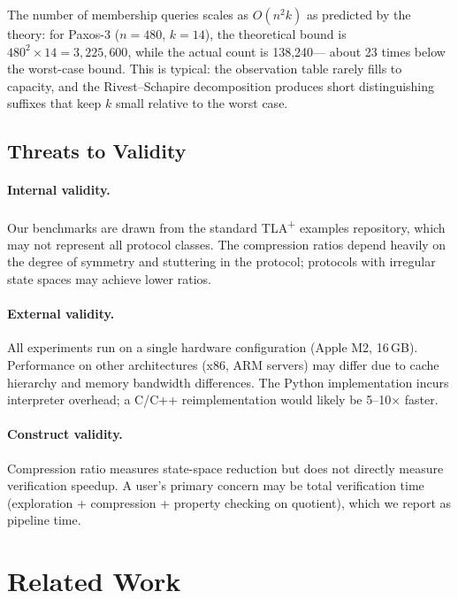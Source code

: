 \documentclass[11pt]{article}
\newcommand{\TLAplus}{TLA\textsuperscript{+}}
\begin{document}
The number of membership queries scales as $O(n^2 k)$ as predicted by the
theory: for Paxos-3 ($n = 480$, $k = 14$), the theoretical bound is
$480^2 \times 14 = 3{,}225{,}600$, while the actual count is 138{,}240---
about 23 times below the worst-case bound.
This is typical: the observation table rarely fills to capacity, and
the Rivest--Schapire decomposition produces short distinguishing suffixes
that keep $k$ small relative to the worst case.

\subsection{Threats to Validity}

\paragraph{Internal validity.}
Our benchmarks are drawn from the standard \TLAplus{} examples repository,
which may not represent all protocol classes.
The compression ratios depend heavily on the degree of symmetry and
stuttering in the protocol; protocols with irregular state spaces may
achieve lower ratios.

\paragraph{External validity.}
All experiments run on a single hardware configuration (Apple M2, 16\,GB).
Performance on other architectures (x86, ARM servers) may differ due to
cache hierarchy and memory bandwidth differences.
The Python implementation incurs interpreter overhead; a C/C++
reimplementation would likely be 5--10$\times$ faster.

\paragraph{Construct validity.}
Compression ratio measures state-space reduction but does not directly
measure verification speedup.
A user's primary concern may be total verification time (exploration +
compression + property checking on quotient), which we report as
pipeline time.


\section{Related Work}
\label{sec:related}
\end{document}
